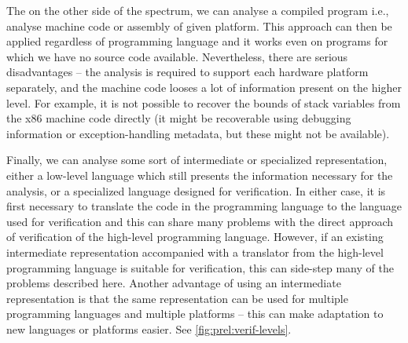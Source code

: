 The on the other side of the spectrum, we can analyse a compiled program i.e., analyse machine code or assembly of given platform.
This approach can then be applied regardless of programming language and it works even on programs for which we have no source code available.
Nevertheless, there are serious disadvantages -- the analysis is required to support each hardware platform separately, and the machine code looses a lot of information present on the higher level.
For example, it is not possible to recover the bounds of stack variables from the x86 machine code directly (it might be recoverable using debugging information or exception-handling metadata, but these might not be available).

Finally, we can analyse some sort of intermediate or specialized representation, either a low-level language which still presents the information necessary for the analysis, or a specialized language designed for verification.
In either case, it is first necessary to translate the code in the programming language to the language used for verification and this can share many problems with the direct approach of verification of the high-level programming language.
However, if an existing intermediate representation accompanied with a translator from the high-level programming language is suitable for verification, this can side-step many of the problems described here.
Another advantage of using an intermediate representation is that the same representation can be used for multiple programming languages and multiple platforms -- this can make adaptation to new languages or platforms easier.
See \autoref{fig:prel:verif-levels}.

